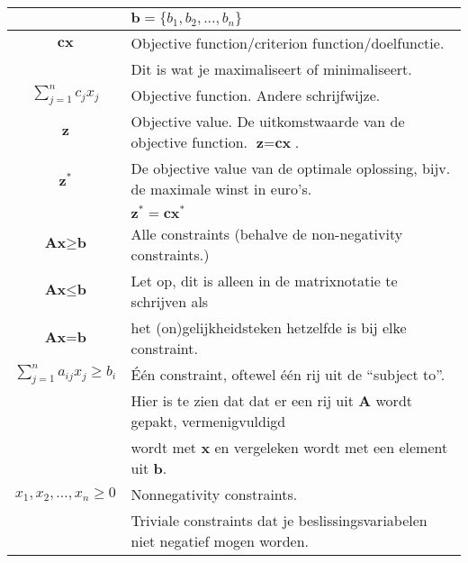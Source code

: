 \documentclass[10pt,a4paper]{article}
\begin{document}
\begin{tabular}{|c|l|}
 & $\textbf{b} = \{b_1, b_2, ..., b_n\}$\\
\hline
$\textbf{cx}$ & Objective function/criterion function/doelfunctie. \\ & 	Dit is wat je maximaliseert of minimaliseert.\\
\hline
$\displaystyle\sum\limits_{j=1}^n c_jx_j$ & Objective function. Andere schrijfwijze. \\
\hline
$\textbf{z}$ & Objective value. De uitkomstwaarde van de objective function. $\textbf{z} = \textbf{cx}$.\\
\hline
$\textbf{z}^*$ & De objective value van de optimale oplossing, bijv. de maximale winst in euro's. \\ %
 & $\textbf{z}^* = \textbf{cx}^*$ \\
\hline
$\textbf{Ax} \geq \textbf{b}$ & Alle constraints (behalve de non-negativity constraints.)\\
$\textbf{Ax} \leq \textbf{b}$ & Let op, dit is alleen in de matrixnotatie te schrijven als \\
$\textbf{Ax} = \textbf{b}$ & het (on)gelijkheidsteken hetzelfde is bij elke constraint.\\
\hline
$\displaystyle\sum\limits_{j=1}^n a_{ij}x_j \ge b_i$ & Één constraint, oftewel één rij uit de ``subject to''.\\
 & Hier is te zien dat dat er een rij uit $\textbf{A}$ wordt gepakt, vermenigvuldigd \\ &  wordt met $\textbf{x}$ en vergeleken wordt met een element uit $\textbf{b}$. \\
\hline
$x_1, x_2, ..., x_n \geq 0$ & Nonnegativity constraints. \\ & Triviale constraints dat je beslissingsvariabelen niet negatief mogen worden.\\
\hline
\end{tabular}

\newpage
\end{document}
